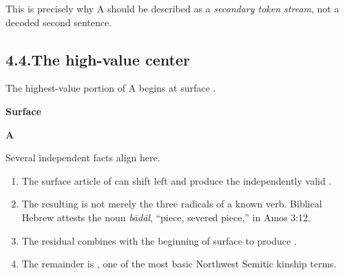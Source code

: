 This is precisely why A should be described as a \emph{secondary token stream}, not a decoded second sentence.

\subsection*{4.4.\quad The high-value center}

The highest-value portion of A begins at surface .

\noindent
\begin{minipage}[t]{0.48\linewidth}
{\centering\textbf{Surface}\par}
\end{minipage}
\hfill
\begin{minipage}[t]{0.48\linewidth}
{\centering\textbf{A}\par}
\end{minipage}

Several independent facts align here.

\begin{enumerate}
\item The surface article  of  can shift left and produce the independently valid .
\item The resulting  is not merely the three radicals of a known verb.  Biblical Hebrew attests the noun \textit{bādāl}, ``piece, severed piece,'' in Amos 3:12.\cite{BDB}
\item The residual  combines with the beginning of surface  to produce .
\item The remainder is , one of the most basic Northwest Semitic kinship terms.
\end{enumerate}

